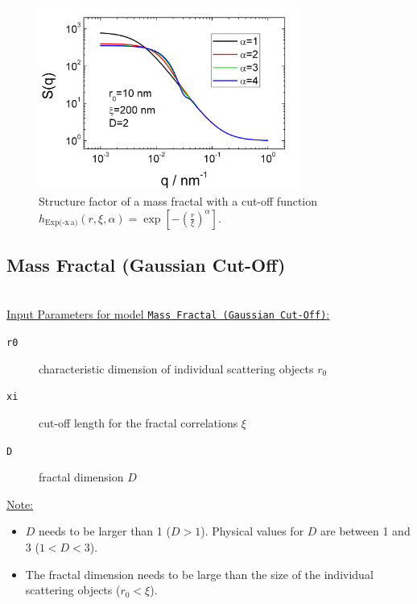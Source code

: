 \begin{figure}[htb]
\begin{center}
\includegraphics[width=0.768\textwidth,height=0.488\textwidth]{../images/structure_factor/MassFractals/SQExp(pow(x,a))CutOff.png}
\end{center}
\caption{Structure factor of a mass fractal with a cut-off function
$h_\text{Exp(-x$\hat{~}$a)}(r,\xi,\alpha) = \exp\left[-\left(\tfrac{r}{\xi}\right)^\alpha\right]$.}
\label{fig:SQExpxaCutOff}
\end{figure}


\clearpage
\subsection{Mass Fractal (Gaussian Cut-Off)}
~\\

\underline{Input Parameters for model \texttt{Mass Fractal (Gaussian Cut-Off)}:}
\begin{description}
\item[\texttt{r0}] characteristic dimension of individual scattering objects $r_0$
\item[\texttt{xi}] cut-off length for the fractal correlations $\xi$
\item[\texttt{D}] fractal dimension $D$
\end{description}

\underline{Note:}
\begin{itemize}
\item $D$ needs to be larger than 1 ($D>1$). Physical values for $D$ are between 1 and 3 ($1<D<3$).
\item The fractal dimension needs to be large than the size of the individual scattering objects ($r_0 < \xi$).
\end{itemize}

